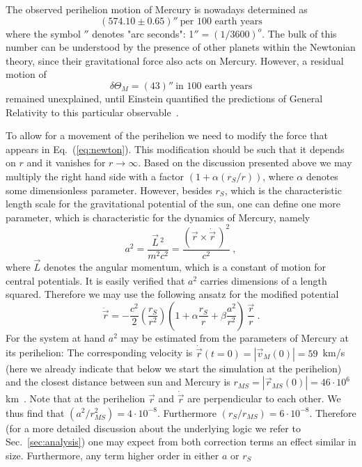 \documentclass[12pt,ngerman,american]{iopart}
\newcommand{\abs}[1]{\left\vert #1 \right\vert}
\begin{document}
The observed perihelion motion of Mercury is nowadays determined as
$$(574.10\pm 0.65)'' \ \mbox{per
100 earth years}$$
where the symbol $''$ denotes "arc seconds": 1$''=(1/3600)^o$. The bulk of this number
can be understood by the presence of other planets within the Newtonian theory, since
their gravitational force also acts on Mercury. However, a
residual motion of
\begin{equation}\delta \Theta_M = (43)'' \ \mbox{in 100 earth years}\label{delT}\end{equation}
 remained unexplained, until Einstein quantified the
predictions of General Relativity to this particular observable~\cite{Einstein}.

To allow for a movement of the perihelion we need to modify the force that appears in Eq.~(\ref{eq:newton}).
This modification should be such that it depends on $r$ and it vanishes for $r\to \infty$.
Based on the discussion presented above we may multiply the right hand side with a factor
$(1+\alpha(r_S/r))$, where $\alpha$ denotes some dimensionless parameter.
However, besides $r_S$, which is the characteristic length scale for the gravitational potential
of the sun, one can define one more parameter, which is characteristic for the dynamics of Mercury, namely
\begin{equation}
a^2=\frac{\vec L\,^2}{m^2c^2}= \frac{(\vec r\times \dot{\vec r} \, )^2}{c^2} \ ,
\label{a2def}
\end{equation}
where $\vec L$ denotes the angular momentum, which is a constant of motion for central potentials.
It is easily verified that $a^2$ carries dimensions of a length squared.  Therefore we may use  the following ansatz
for the modified potential
\begin{equation}
\ddot{\vec r} = - \frac{c^2}{2}\left(\frac{r_S}{r^2}\right)\left(1+\alpha\frac{r_S}{r}+\beta\frac{a^2}{r^2}\right) \, \frac{\vec{r}}{r} \ .
\label{eq:newton_art}
\end{equation}
For the system at hand $a^2$ may be estimated from the parameters of Mercury at its perihelion: The corresponding velocity is
 $\dot{\vec r}(t=0)=\abs{\vec v_M(0)} = 59$~km/s (here we
already indicate that below we start the simulation at the perihelion) and the closest distance between sun and Mercury is
$ r_{MS}=\abs{\vec r_{MS}(0)} = 46 \cdot 10^6$km~\cite{MercuryFactSheet}. Note that at the perihelion $\vec r$ and $\dot{\vec r}$ are perpendicular to each other.
We thus find that $(a^2/ r_{MS}^2) = 4\cdot10^{-8}$. Furthermore $(r_S/r_{MS})=6\cdot 10^{-8}$.
Therefore (for a more detailed discussion about the underlying logic we refer to Sec.~\ref{sec:analysis}) one may expect from both correction terms an effect similar in size. Furthermore, any term higher order in either $a$ or $r_S$
\end{document}
